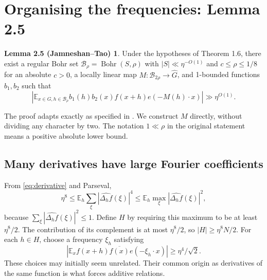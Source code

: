 \documentclass[11pt,a4paper]{article}
\newcommand{\E}{\mathbb E}
\newcommand{\Gh}{\widehat G}
\newcommand{\Bohr}{\operatorname{Bohr}}
\newcommand{\bb}{\mathcal B}
\newcommand{\abs}[1]{\left|#1\right|}
\newcommand{\poly}{\eta^{O(1)}}
\newcommand{\ipoly}{\eta^{-O(1)}}
\newcommand{\JT}[1]{\cite[#1]{JT}}
\newcommand{\GT}[1]{\cite[#1]{GT}}
\theoremstyle{definition}
\newtheorem*{frequencylemma}{Lemma 2.5 (Jamneshan--Tao)}
\numberwithin{equation}{section}
\begin{document}
\section{Organising the frequencies: Lemma 2.5}\label{sec:frequencies}
\begin{frequencylemma}
Under the hypotheses of Theorem 1.6, there exist a regular Bohr set
$\bb_\rho=\Bohr(S,\rho)$ with $|S|\ll\ipoly$ and
$c\leq\rho\leq1/8$ for an absolute $c>0$, a locally linear map
$M:\bb_{2\rho}\to\Gh$, and 1-bounded functions $b_1,b_2$ such that
\begin{equation}\label{eq:frequency-correlation}
\abs{\E_{x\in G,h\in\bb_\rho}
b_1(h)b_2(x)f(x+h)e(-M(h)\cdot x)}\gg\poly.
\end{equation}
\end{frequencylemma}
The proof adapts \GT{Propositions 5.1, 5.4, 9.1 and 9.3} exactly as
specified in \JT{Lemma 2.5}. We construct $M$ directly, without
dividing any character by two. The notation $1\ll\rho$ in the original
statement means a positive absolute lower bound.

\subsection{Many derivatives have large Fourier coefficients}
From \eqref{eq:derivative} and Parseval,
\[
\eta^8\leq\E_h\sum_\xi|\widehat{\Delta_hf}(\xi)|^4
\leq\E_h\max_\xi|\widehat{\Delta_hf}(\xi)|^2,
\]
because $\sum_\xi|\widehat{\Delta_hf}(\xi)|^2\leq1$. Define $H$
by requiring this maximum to be at least $\eta^8/2$. The contribution
of its complement is at most $\eta^8/2$, so $|H|\geq\eta^8N/2$.
For each $h\in H$, choose a frequency $\xi_h$ satisfying
\begin{equation}\label{eq:good-frequency}
\abs{\E_x f(x+h)\overline{f(x)}e(-\xi_h\cdot x)}
\geq\eta^4/\sqrt2.
\end{equation}
These choices may initially seem unrelated. Their common origin as
derivatives of the same function is what forces additive relations.
\end{document}
